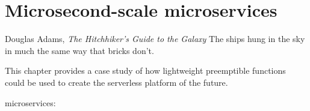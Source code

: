 \chapter{Microsecond-scale microservices}
\label{chap:microservices}

\ifdefined\chapquotes
\begin{chapquote}{Douglas Adams, \textit{The Hitchhiker's Guide to the Galaxy}}
The ships hung in the sky in much the same way that bricks don't.
\end{chapquote}
\fi



This chapter provides a case study of how lightweight preemptible functions could be
used to create the serverless platform of the future.

\begin{namespacereferences}{microservices:}









\end{namespacereferences}
